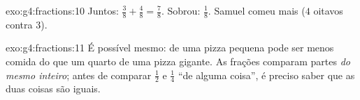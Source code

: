 \begin{solution}{exo:g4:fractions:10}
Juntos: $\frac38 + \frac48 = \frac78$. Sobrou: $\frac18$. Samuel
comeu mais ($4$ oitavos contra $3$).
\end{solution}

\begin{solution}{exo:g4:fractions:11}
É possível mesmo:  de uma pizza pequena pode ser menos comida
do que um quarto de uma pizza gigante. As frações comparam partes
\emph{do mesmo inteiro}; antes de comparar $\frac12$ e $\frac14$ ``de
alguma coisa'', é preciso saber que as duas coisas são iguais.
\end{solution}
